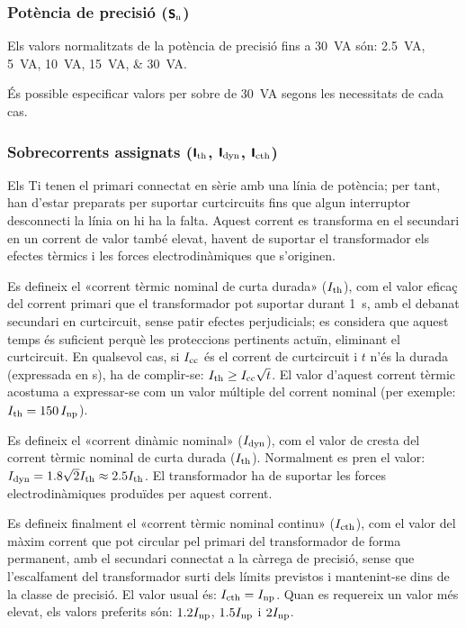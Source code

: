 \subsubsection{Potència de precisió (${\boldsymbol{\mathsf{S_\text{n}}}}$)}

 Els valors normalitzats de la potència de precisió fins a \qty{30}{VA}
són: \qtylist{2,5; 5;10; 15; 30}{VA}.

És possible especificar valors per sobre de \qty{30}{VA} segons les necessitats de cada cas.

\subsubsection{Sobrecorrents  assignats (${\boldsymbol{\mathsf{I_\text{th}}}}$, ${\boldsymbol{\mathsf{I_\text{dyn}}}}$, ${\boldsymbol{\mathsf{I_\text{cth}}}}$)}

 Els Ti
tenen el primari connectat en sèrie amb una línia de potència; per tant, han
d'estar preparats per suportar curtcircuits fins que algun
interruptor desconnecti la línia on hi ha la falta. Aquest
corrent es transforma en el secundari en un corrent de valor
també elevat, havent de suportar el transformador els efectes tèrmics
i les forces electrodinàmiques que s'originen.

Es defineix el «corrent tèrmic nominal de curta durada»
($I_\mathrm{th}$), com el valor eficaç del  corrent primari que el
transformador pot suportar durant \qty{1}{s}, amb el debanat
secundari en curtcircuit, sense patir efectes perjudicials; es
considera que aquest temps és suficient perquè les proteccions
pertinents actuïn, eliminant el curtcircuit. En qualsevol cas, si
$I_\mathrm{cc}$ és el corrent de curtcircuit i $t$ n'és la durada
(expressada en s), ha de complir-se: $I_\mathrm{th}\geq
I_\mathrm{cc}\sqrt{t}$. El valor d'aquest corrent tèrmic
acostuma a expressar-se com  un valor múltiple del corrent
nominal (per exemple: $I_\mathrm{th}=150\,I_\mathrm{np}$).

Es defineix el «corrent dinàmic nominal» ($I_\mathrm{dyn}$), com el
valor de cresta del corrent tèrmic nominal de curta durada ($I_\mathrm{th}$).
Normalment es pren el valor: $I_\mathrm{dyn} =
\num{1,8}\sqrt{2}I_\mathrm{th}\approx \num{2,5}I_\mathrm{th}$. El transformador ha de
suportar les forces electrodinàmiques produïdes per aquest corrent.

Es defineix finalment el «corrent tèrmic nominal continu» ($I_\mathrm{cth}$), com
el valor del màxim corrent que pot circular pel primari del
transformador  de forma permanent, amb el secundari connectat a la
càrrega de precisió, sense que l'escalfament del transformador surti
dels límits previstos i mantenint-se dins de la
 classe de precisió. El valor usual és: $I_\mathrm{cth} = I_\mathrm{np}$. Quan es requereix un valor més elevat, els valors preferits són:
$\num{1,2}I_\mathrm{np}$, $\num{1,5}I_\mathrm{np}$ i $2 I_\mathrm{np}$.

